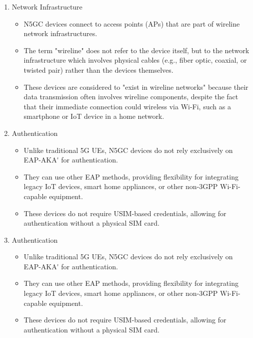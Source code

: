 \begin{enumerate}
    \item{
        Network Infrastructure
        \begin{itemize}
            \item{
                \ac{N5GC} devices connect to access points (\acp{AP}) that are part of wireline network infrastructures.
            }
            \item{
                The term "wireline" does not refer to the device itself, but to the network infrastructure which involves physical cables (e.g., fiber optic, coaxial, or twisted pair) rather than the devices themselves.
            }
            \item{
                These devices are considered to "exist in wireline networks" because their data transmission often involves wireline components, despite the fact that their immediate connection could wireless via Wi-Fi, such as a smartphone or IoT device in a home network.
            }
        \end{itemize}
    }
    \item{
        Authentication
        \begin{itemize}
            \item{
                Unlike traditional \ac{5G} \ac{UE}s, \ac{N5GC} devices do not rely exclusively on \ac{EAP-AKA'} for authentication.
            }
            \item{
                They can use other \ac{EAP} methods, providing flexibility for integrating legacy IoT devices, smart home appliances, or other non-\ac{3GPP} Wi-Fi-capable equipment.
            }
            \item{
                These devices do not require \ac{USIM}-based credentials, allowing for authentication without a physical \ac{SIM} card.
            }
        \end{itemize}
    }
    \item{
        Authentication
        \begin{itemize}
            \item{
                Unlike traditional \ac{5G} \ac{UE}s, \ac{N5GC} devices do not rely exclusively on \ac{EAP-AKA'} for authentication.
            }
            \item{
                They can use other \ac{EAP} methods, providing flexibility for integrating legacy IoT devices, smart home appliances, or other non-\ac{3GPP} Wi-Fi-capable equipment.
            }
            \item{
                These devices do not require \ac{USIM}-based credentials, allowing for authentication without a physical \ac{SIM} card.
            }
        \end{itemize}
    }
\end{enumerate}

